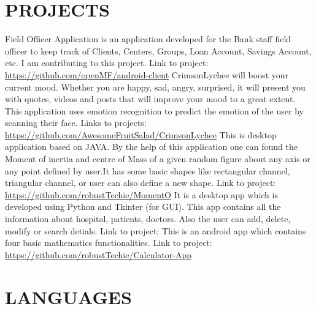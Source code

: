 \documentclass[11pt,a4paper,sans]{moderncv}        %
\begin{document}
\section{PROJECTS}
{Field Officer Application is an application developed for the Bank staff field officer to keep track of Clients, Centers, Groups, Loan Account, Savings Account, etc. I am contributing to this project. Link to project:{\newline} 
\url{https://github.com/openMF/android-client}}{}  %
{CrimsonLychee will boost your current mood. Whether you are happy, sad, angry, surprised, it will present you with quotes, videos and posts that will improve your mood to a great extent. This application uses emotion recognition to predict the emotion of the user by scanning their face. Links to projects:{\newline} 
\url{https://github.com/AwesomeFruitSalad/CrimsonLychee}}{}  %
{This is desktop application based on JAVA. By the help of this application one can found the Moment of inertia and centre of Mass of a given random figure about any axis or any point defined by user.It has some basic shapes like rectangular channel, triangular channel, or user can also define a new shape.  Link to project:{\newline}
\url{https://github.com/robustTechie/MomentO}}{}
{It is a desktop app which is developed using Python and Tkinter (for GUI). This app contains all the information about hospital, patients, doctors. Also the user can add, delete, modify or search detials. Link to project:{\newline}}{}   %
{This is an android app which contains four basic mathematics functionalities. Link to project:{\newline} 
\url{https://github.com/robustTechie/Calculator-App}}{}  %

\section{LANGUAGES}
\end{document}
